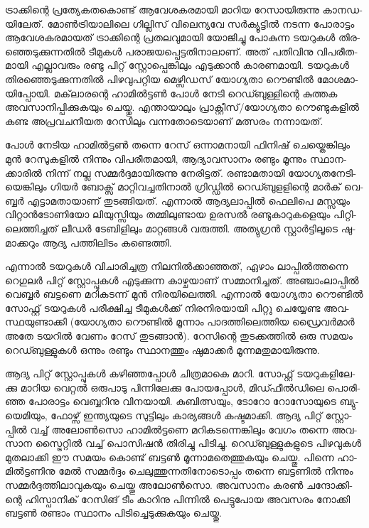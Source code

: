 \vskip 2pt

­ട്രാ­ക്കി­ന്റെ പ്ര­ത്യേ­ക­ത­കൊ­ണ്ട് ആവേ­ശ­ക­ര­മാ­യി മാ­റിയ റേ­സാ­യി­രു­ന്നു കാ­ന­ഡ­യി­ലേ­ത്. മോണ്‍­ട്രി­യാ­ലി­ലെ ഗി­ല്ലി­സ് 
വി­ലെ­ന്യ­വേ സര്‍­ക്യൂ­ട്ടില്‍ നട­ന്ന പോ­രാ­ട്ടം ആവേ­ശ­ക­ര­മാ­യ­ത് ട്രാ­ക്കി­ന്റെ പ്ര­ത­ല­വു­മാ­യി യോ­ജി­ച്ചു പോ­കു­ന്ന ടയ­റു­കള്‍ 
തി­ര­ഞ്ഞെ­ടു­ക്കു­ന്ന­തില്‍ ടീ­മു­കള്‍ പരാ­ജ­യ­പ്പെ­ട്ട­തി­നാ­ലാ­ണ്. അത് പതി­വി­നു വി­പ­രീ­ത­മാ­യി എല്ലാ­വ­രും രണ്ടു പി­റ്റ് 
സ്റ്റോ­പ്പെ­ങ്കി­ലും എടു­ക്കാന്‍ കാ­ര­ണ­മാ­യി. ടയ­റു­കള്‍ തി­ര­ഞ്ഞെ­ടു­ക്കു­ന്ന­തില്‍ പി­ഴ­വു­പ­റ്റിയ ­മെ­ഴ്സി­ഡ­സ് യോ­ഗ്യ­താ റൌ­ണ്ടില്‍ 
മോ­​­ശ­മാ­യി­പ്പോ­യി. മക്‌­ലാ­ര­ന്റെ ഹാ­മില്‍­ട്ടണ്‍ പോള്‍ നേ­ടി റെ­ഡ്ബു­ള്ളി­ന്റെ കു­ത്തക അവ­സാ­നി­പ്പി­ക്കു­ക­യും ചെ­യ്തു. 
എന്താ­യാ­ലും പ്രാ­ക്റ്റീ­സ്/­യോ­ഗ്യ­താ റൌ­ണ്ടു­ക­ളില്‍ കണ്ട അപ്ര­വ­ച­നീ­യത റേ­സി­ലും വന്ന­തോ­ടെ­യാ­ണ് മത്സ­രം നന്നാ­യ­ത്.

­പോള്‍ നേ­ടിയ ഹാ­മില്‍­ട്ടണ്‍ തന്നെ റേ­സ് ഒന്നാ­മ­നാ­യി ഫി­നി­ഷ് ചെ­യ്തെ­ങ്കി­ലും മുന്‍ റേ­സു­ക­ളില്‍ നി­ന്നും വി­പ­രീ­ത­മാ­യി,
ആദ്യാ­വ­സാ­നം രണ്ടും മൂ­ന്നും സ്ഥാ­ന­ക്കാ­രില്‍ നി­ന്ന് നല്ല സമ്മര്‍­ദ്ദ­മാ­യി­രു­ന്നു നേ­രി­ട്ട­ത്. രണ്ടാ­മ­താ­യി യോ­ഗ്യ­ത­നേ­ടി­യെ­ങ്കി­ലും
ഗി­യര്‍ ബോ­ക്സ് മാ­റ്റി­വ­ച്ച­തി­നാല്‍ ഗ്രി­ഡ്ഡില്‍ റെ­ഡ്ബു­ള­ളി­ന്റെ ­മാര്‍­ക് വെ­ബ്ബര്‍ എട്ടാ­മ­താ­യാ­ണ് തു­ട­ങ്ങി­യ­ത്. എന്നാല്‍ 
ആദ്യ­ലാ­പ്പില്‍ ഫെ­ലി­പെ മസ്സ­യും വി­റ്റാന്‍­ടോ­ണി­യോ ലി­യു­സ്സി­യും തമ്മി­ലു­ണ്ടായ ഉര­സല്‍ രണ്ടു­കാ­റു­ക­ളെ­യും 
പി­റ്റി­ലെ­ത്തി­ച്ച­ത് ലീ­ഡര്‍ ടേ­ബി­ളി­ലും മാ­റ്റ­ങ്ങള്‍ വരു­ത്തി. അത്യു­ഗ്രന്‍ സ്റ്റാര്‍­ട്ടി­ലൂ­ടെ ഷു­മാ­ക്ക­റും ആദ്യ പത്തി­ലി­ടം കണ്ടെ­ത്തി­.

എ­ന്നാല്‍ ടയ­റു­കള്‍ വി­ചാ­രി­ച്ച­ത്ര നി­ല­നില്‍­ക്കാ­ഞ്ഞ­ത്, ഏഴാം ലാ­പ്പില്‍­ത്ത­ന്നെ റെ­ഗു­ലര്‍ പി­റ്റ് സ്റ്റോ­പ്പു­കള്‍ എടു­ക്കു­ന്ന 
കാ­ഴ്ച­യാ­ണ് സമ്മാ­നി­ച്ച­ത്. അഞ്ചാം­ലാ­പ്പില്‍ വെ­ബ്ബര്‍ ബട്ട­ണെ മറി­ക­ട­ന്ന് മുന്‍ നി­ര­യി­ലെ­ത്തി. എന്നാല്‍ യോ­ഗ്യ­താ 
റൌ­ണ്ടില്‍ സോ­ഫ്റ്റ് ടയ­റു­കള്‍ പരീ­ക്ഷി­ച്ച ടീ­മു­കള്‍­ക്ക് നി­ര­നി­ര­യാ­യി പി­റ്റു ചെ­യ്യേ­ണ്ട അവ­സ്ഥ­യു­ണ്ടാ­ക്കി (യോ­ഗ്യ­താ 
റൌ­ണ്ടില്‍ മൂ­ന്നാം പാ­ദ­ത്തി­ലെ­ത്തിയ ഡ്രൈ­വര്‍­മാര്‍ അതേ ടയ­റില്‍ വേ­ണം റേ­സ് തു­ട­ങ്ങാന്‍). റേ­സി­ന്റെ തു­ട­ക്ക­ത്തില്‍ 
ഒരു സമ­യം റെ­ഡ്ബു­ള്ളു­കള്‍ ഒന്നും രണ്ടും സ്ഥാ­ന­ത്തും ഷു­മാ­ക്കര്‍ മൂ­ന്ന­മ­തു­മാ­യി­രു­ന്നു­.

ആ­ദ്യ പി­റ്റ് സ്റ്റോ­പ്പു­കള്‍ കഴി­ഞ്ഞ­പ്പോള്‍ ചി­ത്ര­മാ­കെ മാ­റി. സോ­ഫ്റ്റ് ടയ­റു­ക­ളി­ലേ­ക്കു മാ­റിയ വെ­റ്റല്‍ ഒരു­പാ­ടു പി­ന്നി­ലേ­ക്കു 
പോ­യ­പ്പോള്‍, മി­ഡ്ഫീല്‍­ഡി­ലെ പൊ­രി­ഞ്ഞ പോ­രാ­ട്ടം വെ­ബ്ബ­റി­നു വി­ന­യാ­യി. കു­ബി­ത്സ­യും, ടോ­റോ റോ­സോ­യു­ടെ 
ബ്യു­യെ­മി­യും, ഫോ­ഴ്സ് ഇന്ത്യ­യു­ടെ സു­ട്ടി­ലും കാ­ര്യ­ങ്ങള്‍ കഷ്ട­മാ­ക്കി. ആദ്യ പി­റ്റ് സ്റ്റോ­പ്പില്‍ വച്ച് അലോണ്‍­സൊ ഹാ­മില്‍­ട്ട­ണെ
മറി­ക­ട­ന്നെ­ങ്കി­ലും വേ­ഗം തന്നെ അവ­സാന സ്ട്രൈ­റ്റില്‍ വച്ച് പൊ­സി­ഷന്‍ തി­രി­ച്ചു പി­ടി­ച്ചു. റെ­ഡ്ബു­ള്ളു­ക­ളു­ടെ പി­ഴ­വു­കള്‍ 
മു­ത­ലാ­ക്കി ഈ സമ­യം കൊ­ണ്ട് ബട്ടണ്‍ മൂ­ന്നാ­മ­തെ­ത്തു­ക­യും ചെ­യ്തു. പി­ന്നെ ഹാ­മില്‍­ട്ട­ണി­നു മേല്‍ സമ്മര്‍­ദ്ദം 
ചെ­ലു­ത്തു­ന്ന­തി­നോ­ടൊ­പ്പം തന്നെ ബട്ട­ണില്‍ നി­ന്നും സമ്മര്‍­ദ്ദ­ത്തി­ലാ­വു­ക­യും ചെ­യ്തു അലോണ്‍­സൊ. അവ­സാ­നം 
കരണ്‍ ചന്ദോ­ക്കി­ന്റെ ഹി­സ്പാ­നി­ക് റേ­സി­ങ് ടീം കാ­റി­നു പി­ന്നില്‍ പെ­ട്ടു­പോയ അവ­സ­രം നോ­ക്കി ബട്ടണ്‍ രണ്ടാം സ്ഥാ­നം 
പി­ടി­ച്ചെ­ടു­ക്കു­ക­യും ചെ­യ്തു­.

